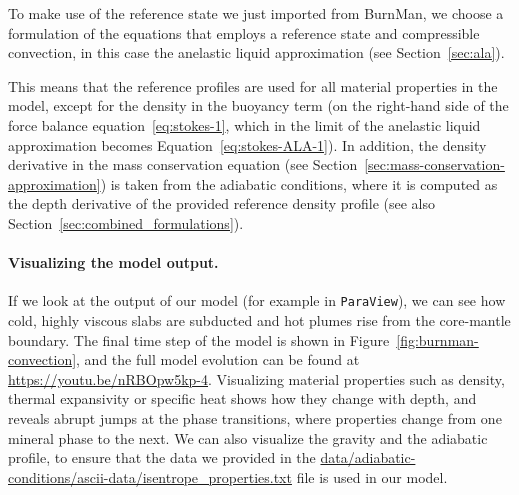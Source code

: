 To make use of the reference state we just imported from BurnMan, we choose a formulation of the
equations that employs a reference state and compressible convection, in this case the anelastic
liquid approximation (see Section~\ref{sec:ala}).

This means that the reference profiles are used for all material properties in the model, except for
the density in the buoyancy term (on the right-hand side of the force balance equation~\eqref{eq:stokes-1},
which in the limit of the anelastic liquid approximation becomes Equation~\eqref{eq:stokes-ALA-1}).
In addition, the density derivative in the mass conservation equation
(see Section~\ref{sec:mass-conservation-approximation}) is taken from the adiabatic
conditions, where it is computed as the depth derivative of the provided reference density profile
(see also Section~\ref{sec:combined_formulations}).

\paragraph{Visualizing the model output.}
If we look at the output of our model (for example in \texttt{ParaView}), we can see how cold, highly
viscous slabs are subducted and hot plumes rise from the core-mantle boundary. The final time step of
the model is shown in Figure~\ref{fig:burnman-convection}, and the full model evolution can be found
at \url{https://youtu.be/nRBOpw5kp-4}.
Visualizing material properties such as density, thermal expansivity or specific heat shows how they
change with depth, and reveals abrupt jumps at the phase transitions, where properties change from one
mineral phase to the next. We can also visualize the gravity and the adiabatic profile, to ensure that
the data we provided in the \url{data/adiabatic-conditions/ascii-data/isentrope_properties.txt} file
is used in our model.

